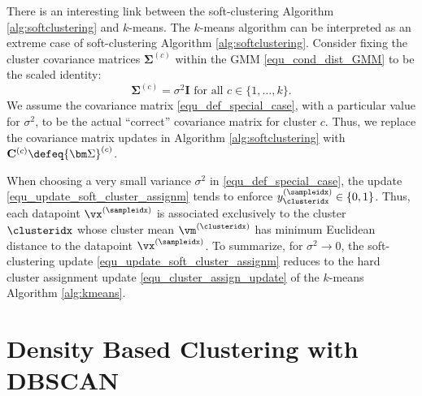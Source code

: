 \documentclass[12pt]{report}
\begin{document}
There is an interesting link between the soft-clustering 
Algorithm \ref{alg:softclustering} and $k$-means. The 
$k$-means algorithm can be interpreted as an extreme 
case of soft-clustering Algorithm \ref{alg:softclustering}. 
Consider fixing the cluster covariance matrices $ {\bm \Sigma}^{(c)}$ 
within the GMM \eqref{equ_cond_dist_GMM} to be the scaled identity: 
\begin{equation}
\label{equ_def_special_case}
 {\bm \Sigma}^{(c)}= \sigma^{2} \mathbf{I} \mbox{ for all } c \in \{1,\ldots,k\}.  
\end{equation} 
We assume the covariance matrix \eqref{equ_def_special_case}, 
with a particular value for $\sigma^{2}$, to be the actual ``correct'' 
covariance matrix for cluster $c$. %
Thus, we replace the covariance matrix updates in Algorithm \ref{alg:softclustering} 
with $\mathbf{C}^{(c)} \defeq  {\bm \Sigma}^{(c)}$.
 
When choosing a very small variance $\sigma^{2}$ in \eqref{equ_def_special_case}, 
the update \eqref{equ_update_soft_cluster_assignm} tends to enforce 
$y_{\clusteridx}^{(\sampleidx)} \in \{0,1\}$. Thus, each datapoint $\vx^{(\sampleidx)}$ 
is associated exclusively to the cluster $\clusteridx$ whose cluster mean $\vm^{(\clusteridx)}$ 
has minimum Euclidean distance to the datapoint $\vx^{(\sampleidx)}$. 
To summarize, for $\sigma^{2} \rightarrow 0$, the soft-clustering update 
\eqref{equ_update_soft_cluster_assignm} reduces to the hard cluster 
assignment update \eqref{equ_cluster_assign_update} of the $k$-means Algorithm \ref{alg:kmeans}. 

\section{Density Based Clustering with DBSCAN}
\end{document}
